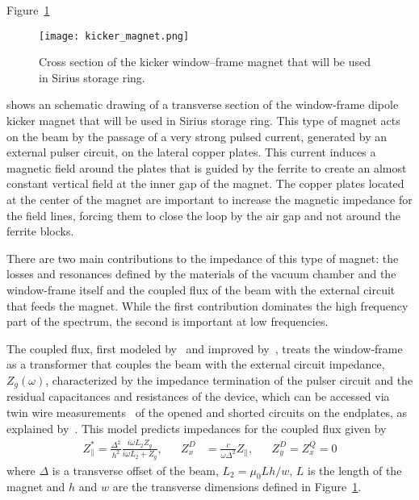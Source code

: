     Figure~\ref{fig:kicker_magnet}
    \begin{figure}
        \centering
        \texttt{[image: kicker\_magnet.png]}
        \caption{Cross section of the kicker window--frame magnet that will be used in Sirius storage ring.}
        \label{fig:kicker_magnet}
    \end{figure}
    shows an schematic drawing of a transverse section of the window-frame dipole kicker magnet that will be used in Sirius storage ring. This type of magnet acts on the beam by the passage of a very strong pulsed current, generated by an external pulser circuit, on the lateral copper plates. This current induces a magnetic field around the plates that is guided by the ferrite to create an almost constant vertical field at the inner gap of the magnet. The copper plates located at the center of the magnet are important to increase the magnetic impedance for the field lines, forcing them to close the loop by the air gap and not around the ferrite blocks.

    There are two main contributions to the impedance of this type of magnet: the losses and resonances defined by the materials of the vacuum chamber and the window-frame itself and the coupled flux of the beam with the external circuit that feeds the magnet. While the first contribution dominates the high frequency part of the spectrum, the second is important at low frequencies.

    The coupled flux, first modeled by~ and improved by~, treats the window-frame as a transformer that couples the beam with the external circuit impedance, $Z_g(\omega)$, characterized by the impedance termination of the pulser circuit and the residual capacitances and resistances of the device, which can be accessed via twin wire measurements~\cite{Mostacci2016} of the opened and shorted circuits on the endplates, as explained by~. This model predicts impedances for the coupled flux given by
    \begin{align}\label{eq:coupled_flux_impedance}
        Z_\parallel^* = \frac{\Delta^2}{h^2}\frac{i\omega L_2 Z_g}{i\omega L_2 + Z_g},
        & & Z_x^D &= \frac{c}{\omega\Delta^2}Z_\parallel, & & Z^D_y=Z^Q_x = 0
    \end{align}
    where $\Delta$ is a transverse offset of the beam, $L_2 = \mu_0Lh/w$, $L$ is the length of the magnet and $h$ and $w$ are the transverse dimensions defined in Figure~\ref{fig:kicker_magnet}.

